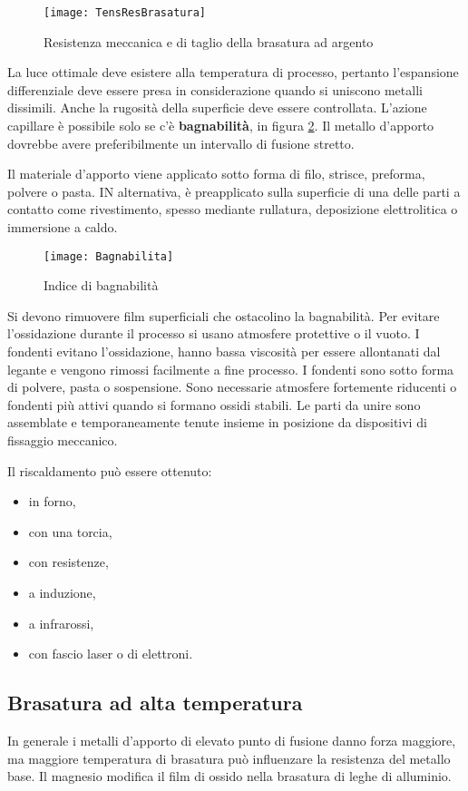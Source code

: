 \begin{figure}
\centering
\texttt{[image: TensResBrasatura]}
\caption{Resistenza meccanica e di taglio della brasatura ad argento}
\label{fig:TensResBrasatura}
\end{figure}

La luce ottimale deve esistere alla temperatura di processo, pertanto l'espansione differenziale deve essere presa in considerazione quando si uniscono metalli dissimili.
Anche la rugosità della superficie deve essere controllata.
L'azione capillare è possibile solo se c'è \textbf{bagnabilità}, in figura \ref{fig:Bagnabilita}.
Il metallo d'apporto dovrebbe avere preferibilmente un intervallo di fusione stretto.

Il materiale d'apporto viene applicato sotto forma di filo, strisce, preforma, polvere o pasta.
IN alternativa, è preapplicato sulla superficie di una delle parti a contatto come rivestimento, spesso mediante rullatura, deposizione elettrolitica o immersione a caldo.

\begin{figure}
\centering
\texttt{[image: Bagnabilita]}
\caption{Indice di bagnabilità}
\label{fig:Bagnabilita}
\end{figure}

Si devono rimuovere film superficiali che ostacolino la bagnabilità.
Per evitare l'ossidazione durante il processo si usano atmosfere protettive o il vuoto.
I fondenti evitano l'ossidazione, hanno bassa viscosità per essere allontanati dal legante e vengono rimossi facilmente a fine processo.
I fondenti sono sotto forma di polvere, pasta o sospensione.
Sono necessarie atmosfere fortemente riducenti o fondenti più attivi quando si formano ossidi stabili.
Le parti da unire sono assemblate e temporaneamente tenute insieme in posizione da dispositivi di fissaggio meccanico.

Il riscaldamento può essere ottenuto:
\begin{itemize}
\item in forno,
\item con una torcia,
\item con resistenze,
\item a induzione,
\item a infrarossi,
\item con fascio laser o di elettroni.
\end{itemize}

\subsection{Brasatura ad alta temperatura}
In generale i metalli d'apporto di elevato punto di fusione danno forza maggiore, ma maggiore temperatura di brasatura può influenzare la resistenza del metallo base.
Il magnesio modifica il film di ossido nella brasatura di leghe di alluminio.

